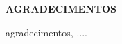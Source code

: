 \thispagestyle{empty}

\begin{center}
\uppercase{\textbf{\large{Agradecimentos}}}
\end{center}

agradecimentos, ....


\clearpage
